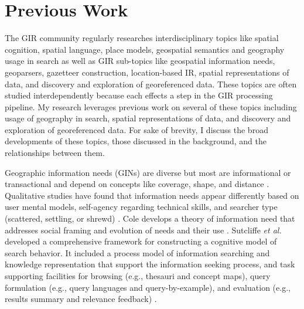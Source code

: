 \chapter{Previous Work} \label{ch:[chapter 4 label]}

The GIR community regularly researches interdisciplinary topics like spatial cognition, spatial language, place models, geospatial semantics and geography usage in search as well as GIR sub-topics like geospatial information needs, \gls{geoparser}s, \gls{gazetteer} construction, location-based IR, spatial representations of data, and discovery and exploration of \gls{georeference}d data. These topics are often studied interdependently because each effects a step in the GIR processing pipeline. My research leverages previous work on several of these topics including usage of geography in search, spatial representations of data, and discovery and exploration of georeferenced data. For sake of brevity, I discuss the broad developments of these topics, those discussed in the background, and the relationships between them.


Geographic information needs (GINs) are diverse but most are informational or transactional  \cite{Reichenbacher2011} \cite{DeSabbata2010} and depend on concepts like coverage, shape, and distance \cite{Henrich2007}. Qualitative studies have found that information needs appear differently based on user mental models, self-agency regarding technical skills, and searcher type (scattered, settling, or shrewd) \cite{Willson2014}. Cole develops a theory of information need that addresses social framing and evolution of needs and their use \cite{Cole2011}. Sutcliffe \emph{et al.} developed a comprehensive framework for constructing a cognitive model of search behavior. It included a process model of information searching and knowledge representation that support the information seeking process, and task supporting facilities for browsing (e.g., thesauri and concept maps), query formulation (e.g., query languages and query-by-example), and evaluation (e.g., results summary and relevance feedback) \cite{Sutcliffe1998}.


